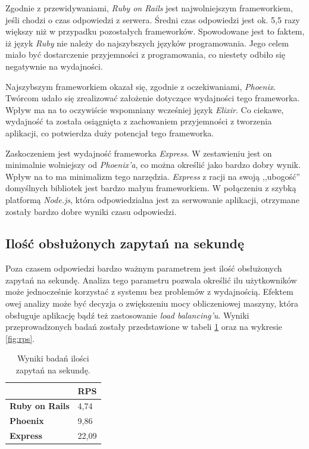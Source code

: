 Zgodnie z przewidywaniami, \emph{Ruby on Rails} jest najwolniejszym frameworkiem, jeśli chodzi o czas odpowiedzi z serwera. Średni czas odpowiedzi jest ok. 5,5 razy większy niż w przypadku pozostałych frameworków. Spowodowane jest to faktem, iż język \emph{Ruby} nie należy do najszybszych języków programowania. Jego celem miało być dostarczenie przyjemności z programowania, co niestety odbiło się negatywnie na wydajności.

Najszybszym frameworkiem okazał się, zgodnie z oczekiwaniami, \emph{Phoenix}. Twórcom udało się zrealizować założenie dotyczące wydajności tego frameworka. Wpływ ma na to oczywiście wspomniany wcześniej język \emph{Elixir}. Co ciekawe, wydajność ta została osiągnięta z zachowaniem przyjemności z tworzenia aplikacji, co potwierdza duży potencjał tego frameworka.

Zaskoczeniem jest wydajność frameworka \emph{Express}. W zestawieniu jest on minimalnie wolniejszy od \emph{Phoenix'a}, co można określić jako bardzo dobry wynik. Wpływ na to ma minimalizm tego narzędzia. \emph{Express} z racji na swoją ,,ubogość'' domyślnych bibliotek jest bardzo małym frameworkiem. W połączeniu z szybką platformą \emph{Node.js}, która odpowiedzialna jest za serwowanie aplikacji, otrzymane zostały bardzo dobre wyniki czasu odpowiedzi.

\subsection{Ilość obsłużonych zapytań na sekundę}
Poza czasem odpowiedzi bardzo ważnym parametrem jest ilość obsłużonych zapytań na sekundę. Analiza tego parametru pozwala określić ilu użytkowników może jednocześnie korzystać z systemu bez problemów z wydajnością. Efektem owej analizy może być decyzja o zwiększeniu mocy obliczeniowej maszyny, która obsługuje aplikację bądź też zastosowanie \emph{load balancing'u}. Wyniki przeprowadzonych badań zostały przedstawione w tabeli \ref{tab:rps} oraz na wykresie \ref{fig:rps}.

\begin{table}[h]
\centering
\caption{Wyniki badań ilości zapytań na sekundę.}
\label{tab:rps}
\begin{tabular}{|l|l|}
\hline
                       & \textbf{RPS} \\ \hline
\textbf{Ruby on Rails} & 4,74         \\ \hline
\textbf{Phoenix}       & 9,86         \\ \hline
\textbf{Express}       & 22,09        \\ \hline
\end{tabular}
\end{table}

